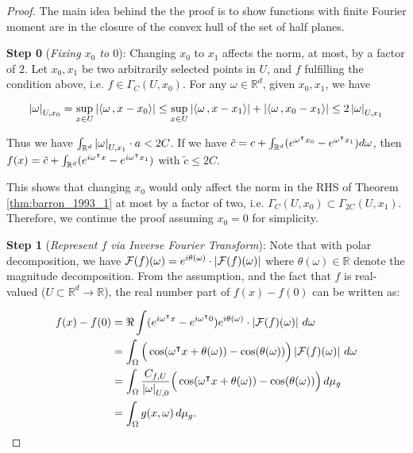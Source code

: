 \begin{proof}

    The main idea behind the the proof is to show functions with finite Fourier
    moment are in the closure of the convex hull of the set of half planes.

    \textbf{Step 0} (\textit{Fixing $x_0$ to $0$}): Changing $x_0$ to $x_1$
    affects the norm, at most, by a factor of $2$. Let $x_0, x_1$ be two
    arbitrarily selected points in $U$, and $f$ fulfilling the condition above,
    i.e. $f \in \Gamma_C(U, x_0)$. For any $\omega \in \mathbb{R}^d$, given
    $x_0, x_1$, we have

    \begin{equation}
        \left| \omega \right|_{U, x_0} 
            = \sup_{x\in U}\left| \left\langle \omega\, , x-x_0 \right\rangle \right| 
            \leq \sup_{x\in U}\left| \left\langle \omega\, , x-x_1 \right\rangle \right| + \left| \left\langle \omega\, , x_0-x_1 \right\rangle \right| 
            \leq 2\left| \omega \right|_{U, x_1}
    \end{equation}

    Thus we have $\int_{\mathbb{R}^d} \left| \omega \right|_{U, x_1} \cdot a < 2C$. If we
    have $\tilde{c} = c + \int_{\mathbb{R}^d} (e^{\omega{}^{\intercal} x_0} - e^{\omega{}^{\intercal}
    x_1}) d\omega$, then $f(x) = \tilde{c} + \int_{\mathbb{R}^d} (e^{i\omega{}^{\intercal}
    x} - e^{i\omega{}^{\intercal} x_1})$ with $\tilde{c} \leq 2C$.

    This shows that changing $x_0$ would only affect the norm in the RHS of
    Theorem \ref{thm:barron_1993_1} at most by a factor of two, i.e.
    $\Gamma_C(U, x_0) \subset \Gamma_{2C}(U, x_1)$. Therefore, we continue the
    proof assuming $x_0 = 0$ for simplicity.

    \textbf{Step 1} (\textit{Represent $f$ via Inverse Fourier Transform}): Note
    that with polar decomposition, we have $\mathcal{F}(f)(\omega) =
    e^{i\theta(\omega)} \cdot \left| \mathcal{F}(f)(\omega) \right|$ where $\theta(\omega)
    \in \mathbb{R}$ denote the magnitude decomposition. From the assumption, and
    the fact that $f$ is real-valued ($U \subset \mathbb{R}^d \to \mathbb{R}$),
    the real number part of $f(x) - f(0)$ can be written as:

    \begin{align}
        \label{eq:barron_fouier_int}
        f(x) - f(0)
        & = \Re \int (e^{i\omega{}^{\intercal} x} - e^{i\omega{}^{\intercal} 0}) e^{i\theta(\omega)} \cdot 
        \left| \mathcal{F}(f)(\omega) \right| \,d\omega \\
        & = \int_{\Omega}\Big(\cos(\omega{}^{\intercal} x + \theta(\omega)) - \cos(\theta(\omega))\Big)
        \left| \mathcal{F}(f)(\omega) \right| \,d\omega \\
        & = \int_{\Omega} \frac{C_{f,U}}{\left| \omega \right|_{U, 0}}\Big(\cos(\omega{}^{\intercal} x + \theta
        (\omega)) - \cos(\theta(\omega))\Big)\,d\mu_g \\
        & = \int_{\Omega} g(x, \omega)\,d\mu_g.
    \end{align}


\end{proof}
